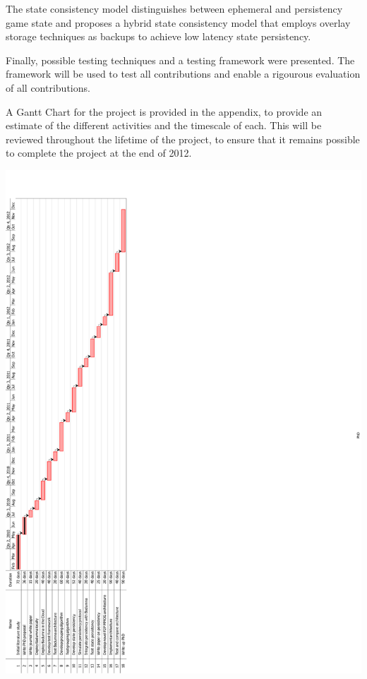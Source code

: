 \documentclass[journal,oneside,a4paper,onecolumn]{IEEEtran}
\begin{document}
The state consistency model distinguishes between ephemeral and persistency game state and proposes a hybrid state consistency model that employs overlay storage techniques as backups to achieve low latency state persistency.

Finally, possible testing techniques and a testing framework were presented. The framework will be used to test all contributions and enable a rigourous evaluation of all contributions.

A Gantt Chart for the project is provided in the appendix, to provide an estimate of the different activities and the timescale of each. This will be reviewed throughout the lifetime of the project, to ensure that it remains possible to complete the project at the end of 2012.

\appendix
\begin{center}
    \includegraphics[clip=true, viewport= 0cm 0cm 10cm 40cm, scale=0.68]{phd_gantt}
\end{center}

\newpage



\end{document}
